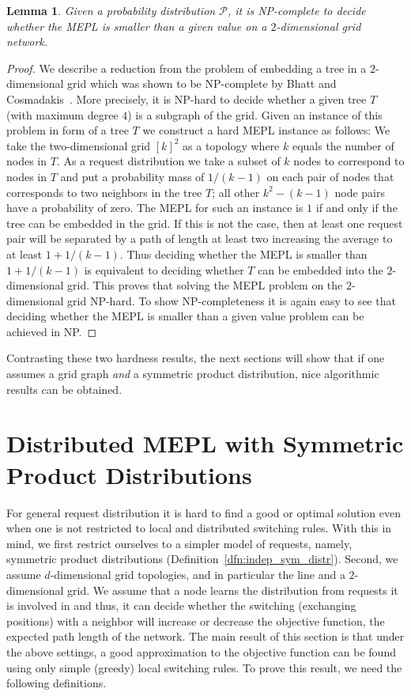 \documentclass[conference]{IEEEtran}
\def\Pc{\mathcal{P}}
\newtheorem{lemma}{Lemma}
\begin{document}
\begin{lemma}\label{lem:2Dhard}\label{LEM:2DHARD}
Given a probability distribution $\Pc$, it is NP-complete to decide whether the MEPL is smaller than a given value on a $2$-dimensional grid network.  
\end{lemma}
\begin{proof}
We describe a reduction from the problem of embedding a tree in a $2$-dimensional grid which was shown to be NP-complete by Bhatt and Cosmadakis~\cite{bhatt1987complexity}. More precisely, it is NP-hard to decide whether a given tree $T$ (with maximum degree $4$) is a subgraph of the grid. Given an instance of this problem in form of a tree $T$ we construct a hard MEPL instance as follows: We take the two-dimensional grid $[k]^2$ as a topology where $k$ equals the number of nodes in $T$. As a request distribution we take a subset of $k$ nodes to correspond to nodes in $T$ and put a probability mass of $1/(k-1)$ on each pair of nodes that corresponds to two neighbors in the tree $T$; all other $k^2 - (k - 1)$ node pairs have a probability of zero. The MEPL for such an instance is $1$ if and only if the tree can be embedded in the grid. If this is not the case, then at least one request pair will be separated by a path of length at least two increasing the average to at least $1 + 1/(k-1)$. Thus deciding whether the MEPL is smaller than $1 + 1/(k-1)$ is equivalent to deciding whether $T$ can be embedded into the $2$-dimensional grid. This proves that solving the MEPL problem on the $2$-dimensional grid NP-hard. To show NP-completeness it is again easy to see that deciding whether the MEPL is smaller than a given value problem can be achieved in NP. 
\end{proof}

Contrasting these two hardness results, the next sections will show that if one assumes a grid graph \emph{and} a symmetric product distribution, nice algorithmic results can be obtained. 

\section{Distributed MEPL with Symmetric Product Distributions} \label{sec:product}

For general request distribution it is hard to find a good or optimal solution even when one is not restricted to local and distributed switching rules. With this in mind, we first restrict ourselves to a simpler model of requests, namely, symmetric product distributions (Definition~\ref{dfn:indep_sym_distr}). Second, we assume $d$-dimensional grid topologies, and in particular the line and a $2$-dimensional grid. We assume that a node learns the distribution from requests it is involved in and thus, it can decide whether the switching (exchanging positions) with a  neighbor will increase or decrease the objective function, the expected path length of the network. 
The main result of this section is that under the above settings, a good approximation to the objective function can be found using only simple (greedy) local switching rules. To prove this result, we need the following definitions.
\end{document}
